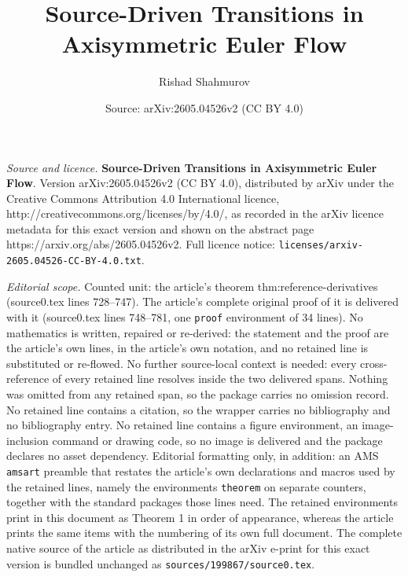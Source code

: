 \documentclass[10pt,a4paper]{amsart}
\title{\textbf{Source-Driven Transitions in Axisymmetric Euler Flow}}
\author{Rishad Shahmurov}
\date{Source: arXiv:2605.04526v2 (CC BY 4.0)}
\begin{document}
\maketitle

\noindent\emph{Source and licence.} \textbf{Source-Driven Transitions in Axisymmetric Euler Flow}. Version arXiv:2605.04526v2 (CC BY 4.0), distributed by arXiv under the Creative Commons Attribution 4.0 International licence, http://creativecommons.org/licenses/by/4.0/, as recorded in the arXiv licence metadata for this exact version and shown on the abstract page https://arxiv.org/abs/2605.04526v2. Full licence notice: \texttt{licenses/arxiv-2605.04526-CC-BY-4.0.txt}.\par\smallskip

\noindent\textit{Editorial scope.} Counted unit: the article's theorem thm:reference-derivatives (source0.tex lines 728--747). The article's complete original proof of it is delivered with it (source0.tex lines 748--781, one \texttt{proof} environment of 34 lines). No mathematics is written, repaired or re-derived: the statement and the proof are the article's own lines, in the article's own notation, and no retained line is substituted or re-flowed.  No further source-local context is needed: every cross-reference of every retained line resolves inside the two delivered spans.  Nothing was omitted from any retained span, so the package carries no omission record.  No retained line contains a citation, so the wrapper carries no bibliography and no bibliography entry.  No retained line contains a figure environment, an image-inclusion command or drawing code, so no image is delivered and the package declares no asset dependency.  Editorial formatting only, in addition: an AMS \texttt{amsart} preamble that restates the article's own declarations and macros used by the retained lines, namely the environments \texttt{theorem} on separate counters, together with the standard packages those lines need.  The retained environments print in this document as Theorem 1 in order of appearance, whereas the article prints the same items with the numbering of its own full document.  The complete native source of the article as distributed in the arXiv e-print for this exact version is bundled unchanged as \texttt{sources/199867/source0.tex}.
\end{document}

